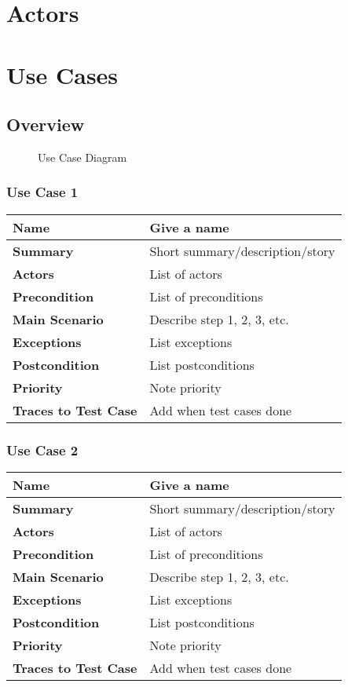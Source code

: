 \documentclass[12pt]{article}
\begin{document}
\section{Actors}

\section{Use Cases}

\subsection{Overview}
\pagebreak
\begin{figure}[htbp]
\caption{Use Case Diagram}
\label{fig:use-case-diagram}
\end{figure}

\subsubsection{Use Case 1} \label{uc:1}
\begin{tabular}{|p{}|p{}|}
\hline
\bf Name & Give a name \\ \hline
\bf Summary & Short summary/description/story \\ \hline
\bf Actors & List of actors \\ \hline
\bf Precondition & List of preconditions \\ \hline
\bf Main Scenario & Describe step 1, 2, 3, etc. \\ \hline
\bf Exceptions & List exceptions \\ \hline
\bf Postcondition & List postconditions \\ \hline
\bf Priority & Note priority \\ \hline
\bf Traces to Test Case & Add when test cases done \\ \hline
\end{tabular}

\subsubsection{Use Case 2} \label{uc:2}
\begin{tabular}{|p{}|p{}|}
\hline
\bf Name & Give a name \\ \hline
\bf Summary & Short summary/description/story \\ \hline
\bf Actors & List of actors \\ \hline
\bf Precondition & List of preconditions \\ \hline
\bf Main Scenario & Describe step 1, 2, 3, etc. \\ \hline
\bf Exceptions & List exceptions \\ \hline
\bf Postcondition & List postconditions \\ \hline
\bf Priority & Note priority \\ \hline
\bf Traces to Test Case & Add when test cases done \\ \hline
\end{tabular}
\end{document}
